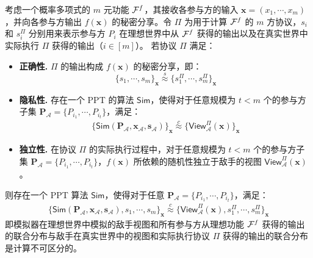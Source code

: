 \begin{theorem}\label{security}
考虑一个概率多项式的 $m$ 元功能 $\mathcal{F}^f$，其接收各参与方的输入 $\textbf{x} = (x_1, \cdots, x_m)$，并向各参与方输出 $f(\textbf{x})$ 的秘密分享。令 $\Pi$ 为用于计算 $\mathcal{F}^f$ 的 $m$ 方协议，$s_i$ 和 $s^{\Pi}_i$ 分别用来表示参与方 $P_i$ 在理想世界中从 $\mathcal{F}^f$ 获得的输出以及在真实世界中实际执行 $\Pi$ 获得的输出（$i \in [m]$）。
若协议 $\Pi$ 满足：
\begin{itemize}[itemsep=2pt,topsep=0pt,parsep=0pt,leftmargin=10pt]
    \item \textbf{正确性.} $\Pi$ 的输出构成 $f(\textbf{x})$ 的秘密分享，即：
    $$\{s_1, \cdots, s_m\}_{\textbf{x}} \overset{s}{\approx} \{s^{\Pi}_1, \cdots, s^{\Pi}_m\}_{\textbf{x}}$$
    \item \textbf{隐私性.} 存在一个 PPT 的算法 $\mathsf{Sim}$，使得对于任意规模为 $t < m$ 个的参与方子集 $\textbf{P}_{\mathcal{A}} = \{P_{i_1},\cdots,P_{i_t}\}$，满足：
    \begin{gather*}
    \{\mathsf{Sim}(\textbf{P}_{\mathcal{A}},\textbf{x}_{\mathcal{A}},\textbf{s}_{\mathcal{A}})\}_{\textbf{x}} \overset{c}{\approx} \{\mathsf{View}_{\mathcal{A}}^\Pi(\textbf{x})\}_{\textbf{x}}
    \end{gather*}
    \item \textbf{独立性.} 在协议 $\Pi$ 的实际执行过程中，对于任意规模为 $t < m$ 个的参与方子集 $\textbf{P}_{\mathcal{A}} = \{P_{i_1},\cdots,P_{i_t}\}$，$f(\textbf{x})$ 所依赖的随机性独立于敌手的视图 ${\mathsf{View}}_{\mathcal{A}}^\Pi(\textbf{x})$。
\end{itemize}
则存在一个 PPT 算法 $\mathsf{Sim}$，使得对于任意 $\textbf{P}_{\mathcal{A}} = \{P_{i_1},\cdots,P_{i_t}\}$，满足：
\begin{gather*}
    \{\mathsf{Sim}(\textbf{P}_{\mathcal{A}},\textbf{x}_{\mathcal{A}},\textbf{s}_{\mathcal{A}}),s_1, \cdots, s_m\}_{\textbf{x}} \overset{c}{\approx} \{\mathsf{View}_{\mathcal{A}}^\Pi(\textbf{x}),s^{\Pi}_1, \cdots, s^{\Pi}_m\}_{\textbf{x}}
\end{gather*}
即模拟器在理想世界中模拟的敌手视图和所有参与方从理想功能 $\mathcal{F}^f$ 获得的输出的联合分布与敌手在真实世界中的视图和实际执行协议 $\Pi$ 获得的输出的联合分布是计算不可区分的。
\end{theorem}

